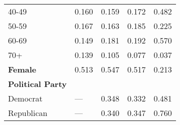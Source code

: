 {\begin{tabular}{L{5.5cm} C{3.5cm} C{3.5cm} C{3.5cm} C{4cm}}
                          40-49                           &                          0.160                           &                          0.159                           &                          0.172                           &                          0.482                            \\
                          50-59                           &                          0.167                           &                          0.163                           &                          0.185                           &                          0.225                            \\
                          60-69                           &                          0.149                           &                          0.181                           &                          0.192                           &                          0.570                            \\
                           70+                            &                          0.139                           &                          0.105                           &                          0.077                           &                          0.037                            \\
\textbf{Female}                                           &                          0.513                           &                          0.547                           &                          0.517                           &                          0.213                            \\
\textbf{Political Party}                                  &                                                          &                                                          &                                                          &                                                           \\
                         Democrat                         &                           ---                            &                          0.348                           &                          0.332                           &                          0.481                            \\
                        Republican                        &                           ---                            &                          0.340                           &                          0.347                           &                          0.760                            \\

\end{tabular}}
